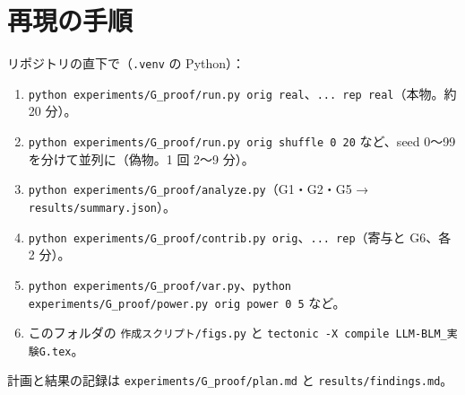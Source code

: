\documentclass[xelatex,ja=standard,jafont=haranoaji,a4paper,10pt,openany]{bxjsreport}
\newcommand{\code}[1]{\texttt{#1}}
\begin{document}
\chapter*{再現の手順}

リポジトリの直下で（\code{.venv} の Python）：

\begin{enumerate}
\item \code{python experiments/G\_proof/run.py orig real}、\code{... rep real}（本物。約 20 分）。
\item \code{python experiments/G\_proof/run.py orig shuffle 0 20} など、seed 0〜99 を分けて並列に（偽物。1 回 2〜9 分）。
\item \code{python experiments/G\_proof/analyze.py}（G1・G2・G5 → \code{results/summary.json}）。
\item \code{python experiments/G\_proof/contrib.py orig}、\code{... rep}（寄与と G6、各 2 分）。
\item \code{python experiments/G\_proof/var.py}、\code{python experiments/G\_proof/power.py orig power 0 5} など。
\item このフォルダの \code{作成スクリプト/figs.py} と \code{tectonic -X compile LLM-BLM\_実験G.tex}。
\end{enumerate}

計画と結果の記録は \code{experiments/G\_proof/plan.md} と \code{results/findings.md}。
\end{document}

